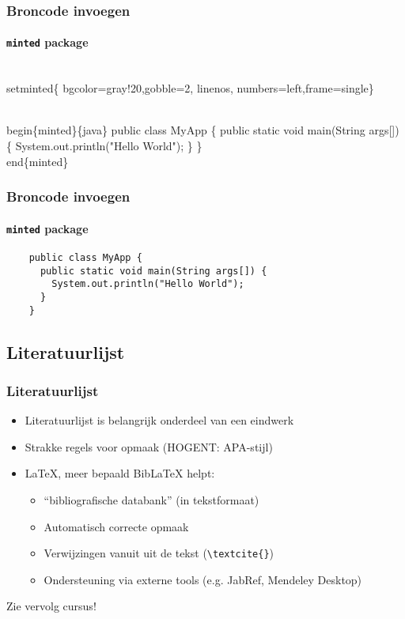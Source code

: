 \documentclass[aspectratio=169]{beamer}
\begin{document}
\begin{frame}[fragile]
  \frametitle{Broncode invoegen}
  \framesubtitle{\texttt{minted} package}

  \begin{semiverbatim}
  \\setminted\{%
    bgcolor=gray!20,gobble=2, linenos,
    numbers=left,frame=single\}

  \\begin\{minted\}\{java\}
    public class MyApp \{
      public static void main(String args[]) \{
        System.out.println("Hello World");
      \}
    \}
  \\end\{minted\}
  \end{semiverbatim}
\end{frame}


\begin{frame}[fragile]
  \frametitle{Broncode invoegen}
  \framesubtitle{\texttt{minted} package}
  \begin{verbatim}
    public class MyApp {
      public static void main(String args[]) {
        System.out.println("Hello World");
      }
    }
  \end{verbatim}
\end{frame}

\subsection{Literatuurlijst}

\begin{frame}[fragile]
  \frametitle{Literatuurlijst}

  \begin{itemize}
    \item<+-> Literatuurlijst is belangrijk onderdeel van een eindwerk
    \item<+-> Strakke regels voor opmaak (HOGENT: APA-stijl)
    \item<+-> {\LaTeX}, meer bepaald Bib{\LaTeX} helpt:
    \begin{itemize}
      \item<+-> ``bibliografische databank'' (in tekstformaat)
      \item<+-> Automatisch correcte opmaak
      \item<+-> Verwijzingen vanuit uit de tekst (\verb|\textcite{}|)
      \item<+-> Ondersteuning via externe tools (e.g. JabRef, Mendeley Desktop)
    \end{itemize}
  \end{itemize}

  \pause Zie vervolg cursus!
\end{frame}
\end{document}
